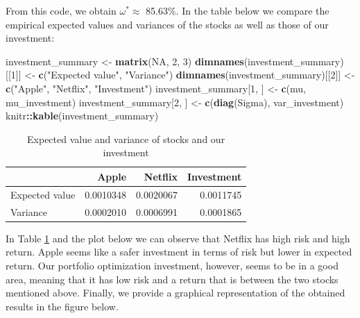 \documentclass[12pt,]{krantz}
\newenvironment{Shaded}{\begin{snugshade}}{\end{snugshade}}
\newcommand{\KeywordTok}[1]{\textcolor[rgb]{0.27,0.27,0.27}{\textbf{#1}}}
\newcommand{\DecValTok}[1]{\textcolor[rgb]{0.06,0.06,0.06}{#1}}
\newcommand{\StringTok}[1]{\textcolor[rgb]{0.5,0.5,0.5}{#1}}
\newcommand{\OtherTok}[1]{\textcolor[rgb]{0.37,0.37,0.37}{#1}}
\newcommand{\OperatorTok}[1]{\textcolor[rgb]{0.43,0.43,0.43}{\textbf{#1}}}
\newcommand{\NormalTok}[1]{#1}
\begin{document}
From this code, we obtain \(\omega^* \approx\) 85.63\%. In the table
below we compare the empirical expected values and variances of the
stocks as well as those of our investment:

\begin{Shaded}
\begin{Highlighting}[]
\NormalTok{investment_summary <-}\StringTok{ }\KeywordTok{matrix}\NormalTok{(}\OtherTok{NA}\NormalTok{, }\DecValTok{2}\NormalTok{, }\DecValTok{3}\NormalTok{)}
\KeywordTok{dimnames}\NormalTok{(investment_summary)[[}\DecValTok{1}\NormalTok{]] <-}\StringTok{ }\KeywordTok{c}\NormalTok{(}\StringTok{"Expected value"}\NormalTok{, }\StringTok{"Variance"}\NormalTok{)}
\KeywordTok{dimnames}\NormalTok{(investment_summary)[[}\DecValTok{2}\NormalTok{]] <-}\StringTok{ }\KeywordTok{c}\NormalTok{(}\StringTok{"Apple"}\NormalTok{, }\StringTok{"Netflix"}\NormalTok{, }\StringTok{"Investment"}\NormalTok{)}
\NormalTok{investment_summary[}\DecValTok{1}\NormalTok{, ] <-}\StringTok{ }\KeywordTok{c}\NormalTok{(mu, mu_investment)}
\NormalTok{investment_summary[}\DecValTok{2}\NormalTok{, ] <-}\StringTok{ }\KeywordTok{c}\NormalTok{(}\KeywordTok{diag}\NormalTok{(Sigma), var_investment)}
\NormalTok{knitr}\OperatorTok{::}\KeywordTok{kable}\NormalTok{(investment_summary)}
\end{Highlighting}
\end{Shaded}

\begin{table}

\caption{\label{tab:tableprtexample}Expected value and variance of stocks and our investment}
\centering
\begin{tabular}[t]{l|r|r|r}
\hline
  & Apple & Netflix & Investment\\
\hline
Expected value & 0.0010348 & 0.0020067 & 0.0011745\\
\hline
Variance & 0.0002010 & 0.0006991 & 0.0001865\\
\hline
\end{tabular}
\end{table}

In Table \ref{tab:tableprtexample} and the plot below we can observe
that Netflix has high risk and high return. Apple seems like a safer
investment in terms of risk but lower in expected return. Our portfolio
optimization investment, however, seems to be in a good area, meaning
that it has low risk and a return that is between the two stocks
mentioned above. Finally, we provide a graphical representation of the
obtained results in the figure below.
\end{document}
